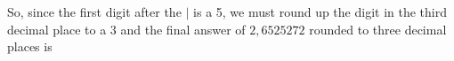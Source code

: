       \label{m38349*id325160}So, since the first digit after the $|$ is a 5, we must round up the digit in the third decimal place to a 3 and the final answer of $2,6525272$ rounded to three decimal places is\par 
      \label{m38349*id325186}\nopagebreak\noindent{}
\par
            \label{m38349*secfhsst!!!underscore!!!id199}\vspace{.5cm} 
      \noindent
